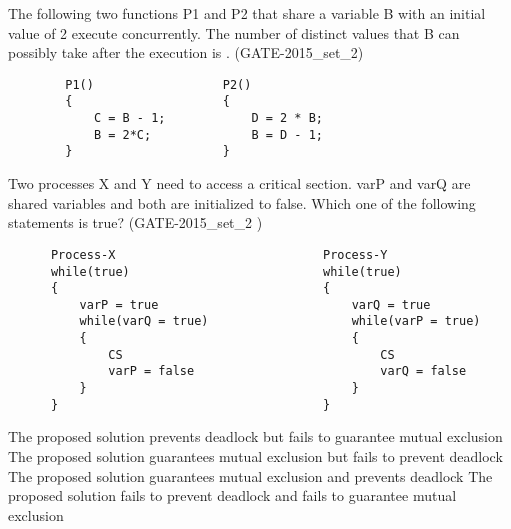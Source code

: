 
\begin{questyle}

  \question  The following two functions P1 and P2 that share a variable B with an initial
   value of 2 execute concurrently. The number of distinct values that B can possibly
   take after the execution is \fillin[]. (GATE-2015\_set\_2)

  \begin{lstlisting}
        P1()                  P2()
        {                     {
            C = B - 1;            D = 2 * B;
            B = 2*C;              B = D - 1;
        }                     }
  \end{lstlisting}

  \end{questyle}




\begin{questyle}

  \question  Two processes X and Y need to access a critical section. varP and varQ are shared variables and both are initialized to false. Which one of the following statements is true? (GATE-2015\_set\_2 )

  \begin{lstlisting}
      Process-X                             Process-Y
      while(true)                           while(true)
      {                                     {
          varP = true                           varQ = true
          while(varQ = true)                    while(varP = true)
          {                                     {
              CS                                    CS
              varP = false                          varQ = false
          }                                     }
      }                                     }
  \end{lstlisting}

  \begin{choices}
    \choice The proposed solution prevents deadlock but fails to guarantee mutual exclusion
    \choice The proposed solution guarantees mutual exclusion but fails to prevent deadlock
    \choice The proposed solution guarantees mutual exclusion and prevents deadlock
    \choice The proposed solution fails to prevent deadlock and fails to guarantee mutual exclusion
  \end{choices}

  \end{questyle}



